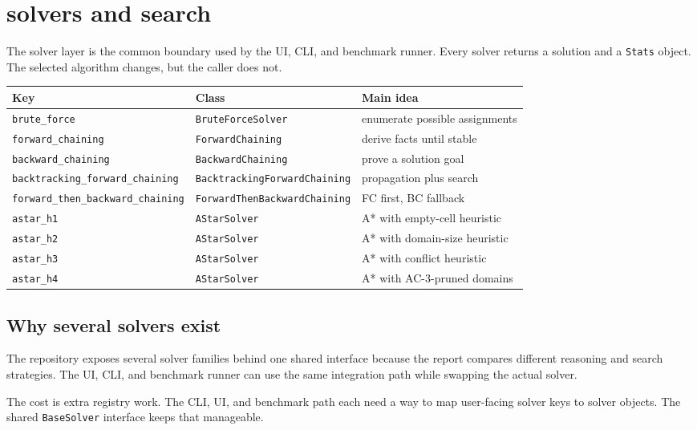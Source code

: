 \documentclass[11pt]{article}
\begin{document}
\section{solvers and search}

The solver layer is the common boundary used by the UI, CLI, and benchmark
runner. Every solver returns a solution and a \texttt{Stats} object. The
selected algorithm changes, but the caller does not.

\begin{table}[h]
\centering
\begin{tabular}{lll}
\toprule
Key & Class & Main idea \\
\midrule
\texttt{brute\_force} & \texttt{BruteForceSolver} & enumerate possible assignments \\
\texttt{forward\_chaining} & \texttt{ForwardChaining} & derive facts until stable \\
\texttt{backward\_chaining} & \texttt{BackwardChaining} & prove a solution goal \\
\texttt{backtracking\_forward\_chaining} & \texttt{BacktrackingForwardChaining} & propagation plus search \\
\texttt{forward\_then\_backward\_chaining} & \texttt{ForwardThenBackwardChaining} & FC first, BC fallback \\
\texttt{astar\_h1} & \texttt{AStarSolver} & A* with empty-cell heuristic \\
\texttt{astar\_h2} & \texttt{AStarSolver} & A* with domain-size heuristic \\
\texttt{astar\_h3} & \texttt{AStarSolver} & A* with conflict heuristic \\
\texttt{astar\_h4} & \texttt{AStarSolver} & A* with AC-3-pruned domains \\
\bottomrule
\end{tabular}
\end{table}

\subsection{Why several solvers exist}

The repository exposes several solver families behind one shared interface
because the report compares different reasoning and search strategies. The UI,
CLI, and benchmark runner can use the same integration path while swapping the
actual solver.

The cost is extra registry work. The CLI, UI, and benchmark path each need a
way to map user-facing solver keys to solver objects. The shared
\texttt{BaseSolver} interface keeps that manageable.
\end{document}

